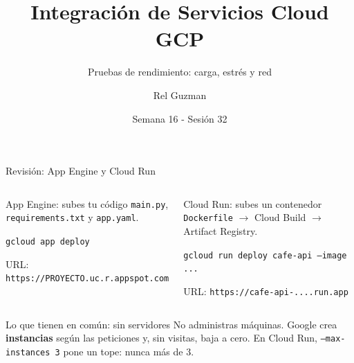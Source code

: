 \documentclass[aspectratio=169,10pt,c]{beamer}
\title{Integración de Servicios Cloud GCP}
\subtitle{Pruebas de rendimiento: carga, estrés y red}
\date{Semana 16 - Sesión 32}
\author{Rel Guzman}
\begin{document}
{\maketitle}

\begin{frame}{Revisión: App Engine y Cloud Run}
\begin{columns}[T,onlytextwidth]
\begin{block}{App Engine: subes tu código}
\small \texttt{main.py}, \texttt{requirements.txt} y \texttt{app.yaml}.\par\smallskip
\texttt{gcloud app deploy}\par\smallskip
URL: \texttt{https://PROYECTO.uc.r.appspot.com}
\end{block}
\begin{block}{Cloud Run: subes un contenedor}
\small \texttt{Dockerfile} $\rightarrow$ Cloud Build $\rightarrow$ Artifact Registry.\par\smallskip
\texttt{gcloud run deploy cafe-api --image ...}\par\smallskip
URL: \texttt{https://cafe-api-....run.app}
\end{block}
\end{columns}
\vspace{4mm}
\begin{center}
\begin{minipage}{.84\textwidth}
\begin{exampleblock}{Lo que tienen en común: sin servidores}
\small No administras máquinas. Google crea \textbf{instancias} según las peticiones y, sin visitas, baja a cero. En Cloud Run, \texttt{--max-instances 3} pone un tope: nunca más de 3.
\end{exampleblock}
\end{minipage}
\end{center}
\end{frame}
\end{document}
